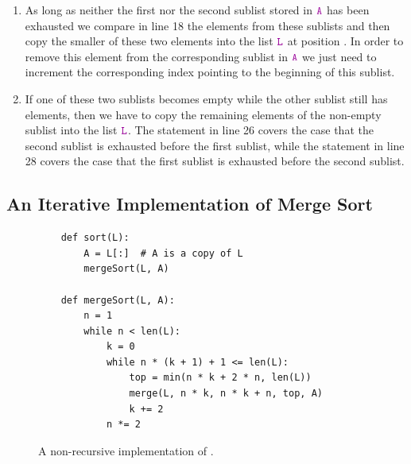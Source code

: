 \begin{enumerate}
\begin{enumerate}
\begin{itemize}
                  element.
            \end{itemize}
            The  loop maintains the following invariants.
            \begin{enumerate}[(i)]
            \item The elements from  and  have already been inserted
                  into the array  and make up the part  of .
            \item The elements from  and  still need to be inserted into
                  the subarray .
            \end{enumerate}
      \item As long as neither the first nor the second sublist stored in $\mytt{A}$ has been exhausted
            we compare in line 18 the elements from these sublists and then copy the smaller of these
            two elements into the list $\mytt{L}$ at position .
            In order to remove this element from the corresponding sublist in $\mytt{A}$ we just need to
            increment the corresponding index pointing to the beginning of this sublist.
      \item If one of these two sublists becomes empty while the other sublist still has elements, then we have
            to copy the remaining elements of the non-empty sublist into the list $\mytt{L}$.
            The statement in line 26 covers the case that the second sublist is exhausted before 
            the first sublist, while the statement in line 28 covers the case that the first
            sublist is exhausted before the second sublist.
      \end{enumerate}
\end{enumerate}

\subsection{An Iterative Implementation of Merge Sort}

\begin{figure}[!ht]
  \centering
\begin{verbatim}
    def sort(L):
        A = L[:]  # A is a copy of L
        mergeSort(L, A)

    def mergeSort(L, A):
        n = 1
        while n < len(L):
            k = 0
            while n * (k + 1) + 1 <= len(L):
                top = min(n * k + 2 * n, len(L))
                merge(L, n * k, n * k + n, top, A)
                k += 2    
            n *= 2 
\end{verbatim}
\vspace*{-0.3cm}
  \caption{A non-recursive implementation of .}
  \label{fig:merge-sort-nr.stlx}
\end{figure}

